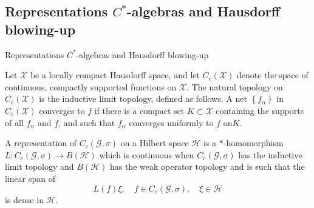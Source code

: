 \documentclass{beamer}
\theoremstyle{plain}
\newcommand{\G}{\mathcal{G}}
\newcommand{\sX}{\mathcal{X}}       %
\renewcommand{\a}{\alpha}
\renewcommand{\H}{\mathcal{H}}               %
\begin{document}
\subsection{Representations $C^*$-algebras and Hausdorff blowing-up}
\begin{frame}
		\begin{center}
	\huge Representations $C^*$-algebras and Hausdorff blowing-up	
	\end{center}
	
	\begin{definition}
		
		Let $\sX$ be a locally compact Hausdorff space, and let $C_c\left(\sX\right)$ denote the	space of continuous, compactly supported functions on $\sX$. The natural	topology on $C_c\left(\sX\right)$ is the \alert{inductive limit topology}, defined as follows. A net	$\left\{f_\a\right\}$ in $C_c\left(\sX\right)$ converges to $f$ if there is a compact set $K\subset\sX$ containing	the supports of all $f_\a$ and $f$, and such that $f_\a$ converges uniformly to $f$ on$K$.
	\end{definition}
	
	\begin{definition}\label{groupoid_representation_defn}
		A \alert{representation} of $C_c\left(\G, \sigma\right)$ on a Hilbert space $\H$ is a $*$-homomorphism $L : C_c\left(\G, \sigma\right) \to B\left(\H \right)$ which is continuous when $C_c\left(\G, \sigma\right)$ has the inductive limit 
		topology  and $B\left(\H \right)$ has the weak operator topology  and is such that the linear  span of
		$$
		L\left(f \right) \xi , \quad f \in C_c\left(\G, \sigma\right), \quad \xi \in \H
		$$
		is dense in $\H$.
	\end{definition}
	
	
\end{frame}
\end{document}
